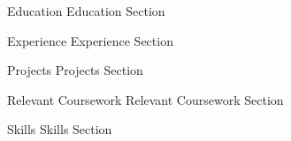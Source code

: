 \documentclass{resume}
\begin{document}
\begin{rSection}{Education}
Education Section
\end{rSection}
\begin{rSection}{Experience}
Experience Section
\end{rSection}
\begin{rSection}{Projects}
Projects Section
\end{rSection}
\begin{rSection}{Relevant Coursework}
Relevant Coursework Section
\end{rSection}
\begin{rSection}{Skills}
Skills Section
\end{rSection}
\end{document}
